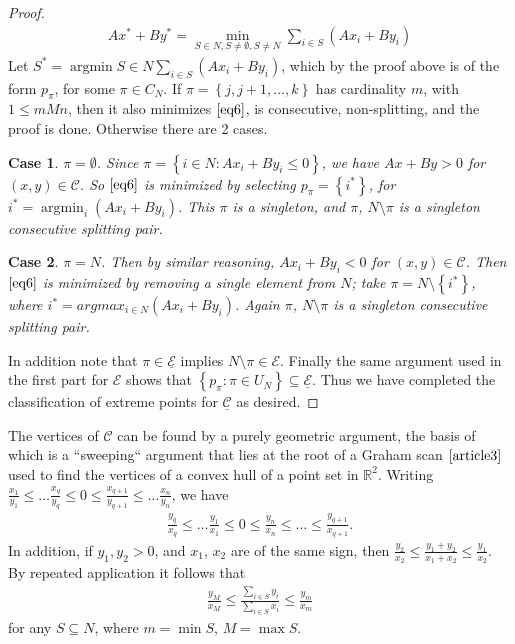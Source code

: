 \documentclass{article}
\theoremstyle{case}
\newtheorem{case}{Case}
\DeclareMathOperator*{\argmin}{argmin} %
\begin{document}
\begin{proof}
\begin{align}
Ax^* + By^* =\min_{S \in N, S \neq \emptyset, S \neq N} \sum_{i \in S} \left( Ax_i + By_i\right)
\end{align}
Let $S^* = \argmin{S \in N} \sum_{i \in S} \left( Ax_i + By_i\right)$, which by the proof above is of the form $p_{\pi}$, for some $\pi \in C_N$. If $\pi = \left\lbrace j,j+1, \dots, k\right\rbrace$ has cardinality $m$, with $1 \leq m M n$, then it also minimizes $\ref{eq6}$, is consecutive, non-splitting, and the proof is done. Otherwise there are 2 cases.
\begin{case}
$\pi = \emptyset$. Since $\pi = \left\lbrace i \in N \colon Ax_i + By_i \leq 0 \right\rbrace$, we have $Ax + By > 0$ for $\left( x,y\right) \in \mathcal{C}$. So $\ref{eq6}$ is minimized by selecting $p_{\pi} = \left\lbrace i^*\right\rbrace$, for $i^* = \argmin_i \left( Ax_i + By_i\right)$. This $\pi$ is a singleton, and $\pi$, $N\setminus \pi$ is a singleton consecutive splitting pair.
\end{case}
\begin{case}
$\pi = N$. Then by similar reasoning, $Ax_i + By_i < 0$ for $\left( x,y\right) \in \mathcal{C}$. Then $\ref{eq6}$ is minimized by removing a single element from $N$; take $\pi = N\setminus \left\lbrace i^*\right\rbrace$, where $i^* = argmax_{i \in N} \left( Ax_i + By_i\right)$. Again $\pi$, $N\setminus \pi$ is a singleton consecutive splitting pair.
\end{case}
In addition note that $\pi \in \underline{\mathcal{E}}$ implies $N\setminus \pi \in \mathcal{E}$. Finally the same argument used in the first part for $\mathcal{E}$ shows that $\left\lbrace p_{\pi} \colon \pi \in U_N\right\rbrace \subseteq \underline{\mathcal{E}}$. Thus we have completed the classification of extreme points for $\underline{\mathcal{C}}$ as desired.
\end{proof}

\vspace{6pt} 
The vertices of $\mathcal{C}$ can be found by a purely geometric argument, the basis of which is a ``sweeping`` argument that lies at the root of a Graham scan $\cite{article3}$ used to find the vertices of a convex hull of a point set in $\mathbb{R}^2$. Writing $\frac{x_1}{y_1} \leq \dots \frac{x_q}{y_q} \leq 0 \leq \frac{x_{q+1}}{y_{q+1}} \leq \dots \frac{x_n}{y_n}$, we have 
\begin{align} \label{eq7}
\frac{y_q}{x_q} \leq \dots \frac{y_1}{x_1} \leq 0 \leq \frac{y_n}{x_n} \leq \dots \leq \frac{y_{q+1}}{x_{q+1}}.
\end{align} 
In addition, if $y_1, y_2 > 0$, and $x_1$, $x_2$ are of the same sign, then $\frac{y_2}{x_2} \leq \frac{y_1+y_2}{x_1+x_2} \leq \frac{y_1}{x_2}.$ By repeated application it follows that
\begin{align} \label{eq8}
\frac{y_M}{x_M} \leq \frac{\sum_{i \in S}y_i}{\sum_{i \in S}x_i} \leq \frac{y_m}{x_m}
\end{align}
for any $S \subseteq N$, where $m = \min S$, $M = \max S$. 
\end{document}
